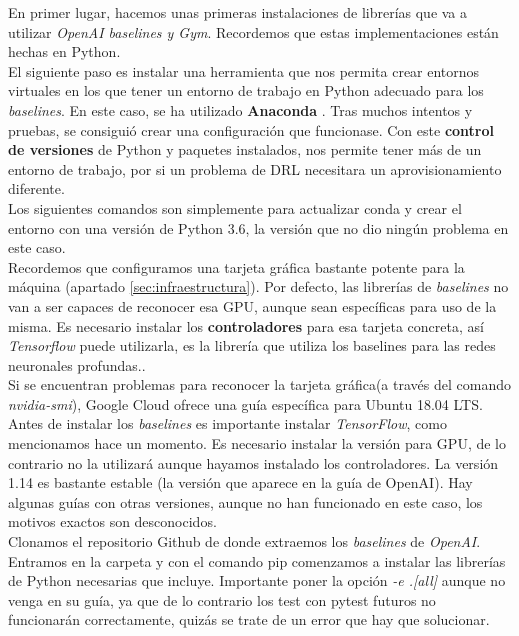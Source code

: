 \documentclass[11pt,fleqn]{book} %
\begin{document}
En primer lugar, hacemos unas primeras instalaciones de librerías que va a utilizar \textit{OpenAI baselines y Gym}. Recordemos que estas implementaciones están hechas en Python. \\

El siguiente paso es instalar una herramienta que nos permita crear entornos virtuales en los que tener un entorno de trabajo en Python adecuado para los \textit{baselines}. En este caso, se ha utilizado \textbf{Anaconda} \cite{article:anaconda}. Tras muchos intentos y pruebas, se consiguió crear una configuración que funcionase. Con este \textbf{control de versiones} de Python y paquetes instalados, nos permite tener más de un entorno de trabajo, por si un problema de DRL necesitara un aprovisionamiento diferente. \\

Los siguientes comandos son simplemente para actualizar conda y crear el entorno con una versión de Python 3.6, la versión que no dio ningún problema en este caso. \\

Recordemos que configuramos una tarjeta gráfica bastante potente para la máquina (apartado \ref{sec:infraestructura}). Por defecto, las librerías de \textit{baselines} no van a ser capaces de reconocer esa GPU, aunque sean específicas para uso de la misma. Es necesario instalar los \textbf{controladores} para esa tarjeta concreta, así \textit{Tensorflow} puede utilizarla, es la librería que utiliza los baselines para las redes neuronales profundas.\cite{article:tensorflow}.\\

Si se encuentran problemas para reconocer la tarjeta gráfica(a través del comando \textit{nvidia-smi}), Google Cloud ofrece una guía específica para Ubuntu 18.04 LTS. \cite{article:GPUgoogle} \\

Antes de instalar los \textit{baselines} es importante instalar \textit{TensorFlow}, como mencionamos hace un momento. Es necesario instalar la versión para GPU, de lo contrario no la utilizará aunque hayamos instalado los controladores. La versión 1.14 es bastante estable (la versión que aparece en la guía de OpenAI\cite{article:baselines}). Hay algunas guías con otras versiones, aunque no han funcionado en este caso, los motivos exactos son desconocidos. \\

Clonamos el repositorio Github de donde extraemos los \textit{baselines} de \textit{OpenAI}. Entramos en la carpeta y con el comando pip comenzamos a instalar las librerías de Python necesarias que incluye. Importante poner la opción \textit{-e .[all]} aunque no venga en su guía, ya que de lo contrario los test con pytest futuros no funcionarán correctamente, quizás se trate de un error que hay que solucionar. \\
\end{document}
